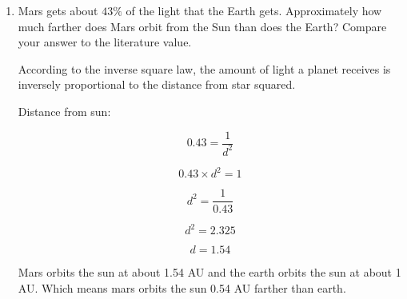 \documentclass[12pt]{article}
\begin{document}
\begin{enumerate}
        \item Mars gets about $43\%$ of the light that the Earth gets. Approximately how much farther does Mars orbit from the Sun than does the Earth? Compare your answer to the literature value.\newline

        According to the inverse square law, the amount of light a planet receives is inversely proportional to the distance from star squared.\newline

        Distance from sun:

        \begin{equation}
            0.43 = \frac{1}{d^{2}}
        \end{equation}

        \begin{equation}
            0.43\times d^{2} = 1
        \end{equation}

        \begin{equation}
            d^{2} = \frac{1}{0.43}
        \end{equation}

        \begin{equation}
            d^{2} = 2.325
        \end{equation}

        \begin{equation}
            d = 1.54
        \end{equation}

        Mars orbits the sun at about 1.54 AU and the earth orbits the sun at about 1 AU. Which means mars orbits the sun 0.54 AU farther than earth.


\end{enumerate}
\end{document}
